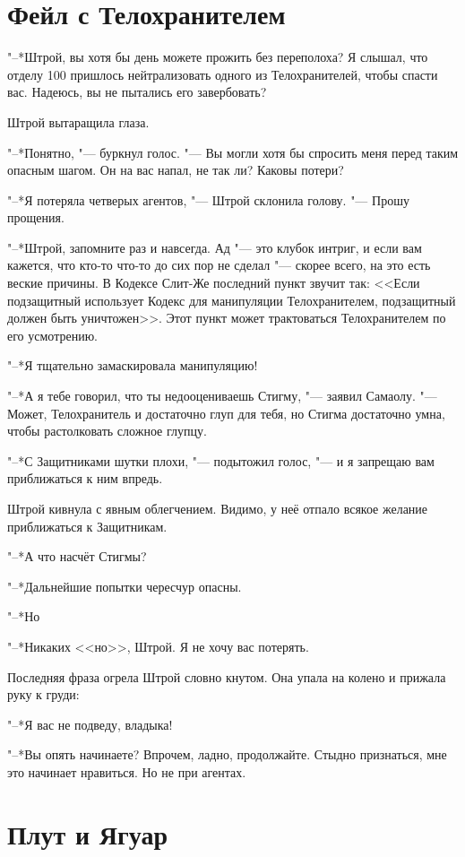 \documentclass[a4paper,10pt,fleqn]{book}
\newcommand{\ldotst}{\so{...}\xspace}
\begin{document}
\section{Фейл с Телохранителем}

"--*Штрой, вы хотя бы день можете прожить без переполоха?
Я слышал, что отделу 100 пришлось нейтрализовать одного из Телохранителей, чтобы спасти вас.
Надеюсь, вы не пытались его завербовать?

Штрой вытаращила глаза.

"--*Понятно, "--- буркнул голос.
"--- Вы могли хотя бы спросить меня перед таким опасным шагом.
Он на вас напал, не так ли?
Каковы потери?

"--*Я потеряла четверых агентов, "--- Штрой склонила голову.
"--- Прошу прощения.

"--*Штрой, запомните раз и навсегда.
Ад "--- это клубок интриг, и если вам кажется, что кто-то что-то до сих пор не сделал "--- скорее всего, на это есть веские причины.
В Кодексе Слит-Же последний пункт звучит так: <<Если подзащитный использует Кодекс для манипуляции Телохранителем, подзащитный должен быть уничтожен>>.
Этот пункт может трактоваться Телохранителем по его усмотрению.

"--*Я тщательно замаскировала манипуляцию!

"--*А я тебе говорил, что ты недооцениваешь Стигму, "--- заявил Самаолу.
"--- Может, Телохранитель и достаточно глуп для тебя, но Стигма достаточно умна, чтобы растолковать сложное глупцу.

"--*С Защитниками шутки плохи, "--- подытожил голос, "--- и я запрещаю вам приближаться к ним впредь.

Штрой кивнула с явным облегчением.
Видимо, у неё отпало всякое желание приближаться к Защитникам.

"--*А что насчёт Стигмы?

"--*Дальнейшие попытки чересчур опасны.

"--*Но\ldotst

"--*Никаких <<но>>, Штрой.
Я не хочу вас потерять.

Последняя фраза огрела Штрой словно кнутом.
Она упала на колено и прижала руку к груди:

"--*Я вас не подведу, владыка!

"--*Вы опять начинаете?
Впрочем, ладно, продолжайте.
Стыдно признаться, мне это начинает нравиться.
Но не при агентах.

\section{Плут и Ягуар}
\end{document}
